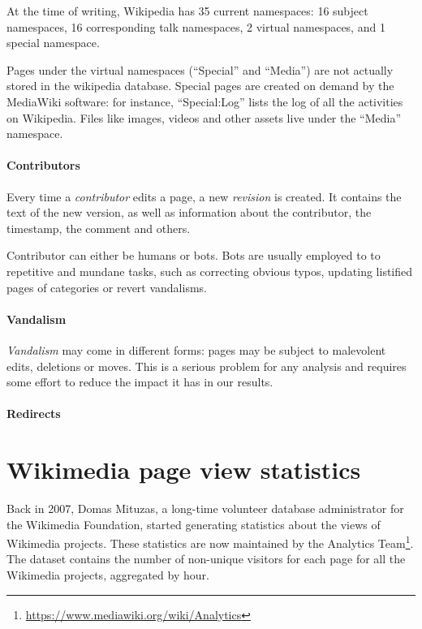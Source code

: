 At the time of writing, Wikipedia has 35 current namespaces: 16 subject namespaces, 16 corresponding talk namespaces, 2 virtual namespaces, and 1 special namespace.

Pages under the virtual namespaces (``Special'' and ``Media'') are not actually stored in the wikipedia database.
Special pages are created on demand by the MediaWiki software: for instance, ``Special:Log'' lists the log of all the activities on Wikipedia.
Files like images, videos and other assets live under the ``Media'' namespace.

\paragraph{Contributors}
Every time a \emph{contributor} edits a page, a new \emph{revision} is created.
It contains the text of the new version, as well as information about the contributor, the timestamp, the comment and others.

Contributor can either be humans or bots.
Bots are usually employed to to repetitive and mundane tasks, such as correcting obvious typos, updating listified pages of categories or revert vandalisms.

\paragraph{Vandalism}
\emph{Vandalism} may come in different forms: pages may be subject to malevolent edits, deletions or moves.
This is a serious problem for any analysis and requires some effort to reduce the impact it has in our results.


\paragraph{Redirects}
\cite{Hill2014}

\section{Wikimedia page view statistics}
\label{sec:pagecounts}
Back in 2007, Domas Mituzas, a long-time volunteer database administrator for the Wikimedia Foundation, started generating statistics about the views of Wikimedia projects.
These statistics are now maintained by the Analytics Team\footnote{\url{https://www.mediawiki.org/wiki/Analytics}}.
The dataset contains the number of non-unique visitors for each page for all the Wikimedia projects, aggregated by hour.

